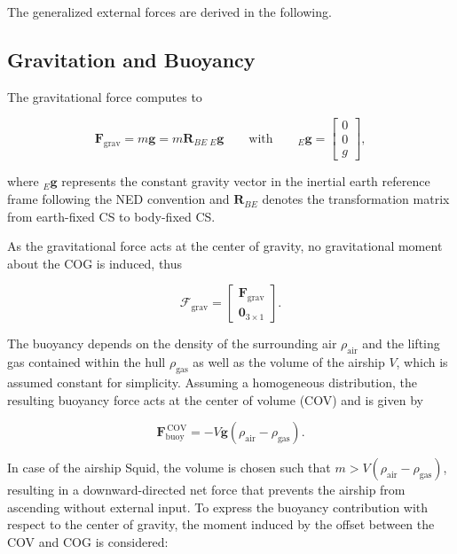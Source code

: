 The generalized external forces are derived in the following.





\subsection{Gravitation and Buoyancy}
The gravitational force computes to

\begin{equation}
	\bm{F}_\mathrm{grav} 
	= 
	m \bm{g} 
	= 
	m \bm{R}_{BE} \, {}_E\bm{g}
	\qquad
	\text{with}
	\qquad
	{}_E\bm{g} 
	= 
	\begin{bmatrix}
		0 \\ 0 \\ g
	\end{bmatrix},
\end{equation}

where ${}_E\bm{g}$ represents the constant gravity vector in the inertial earth reference frame following the NED convention and $\bm{R}_{BE}$ denotes the transformation matrix from earth-fixed CS to body-fixed CS.

As the gravitational force acts at the center of gravity, no gravitational moment about the COG is induced, thus

\begin{equation}
	\bm{\mathcal{F}}_\mathrm{grav} 
	= 
	\begin{bmatrix}
		\bm{F}_\mathrm{grav} \\ \bm{0}_{3 \times 1}
	\end{bmatrix}.
\end{equation}

The buoyancy depends on the density of the surrounding air $\rho_{\mathrm{air}}$ and the lifting gas contained within the hull $\rho_{\mathrm{gas}}$ as well as the volume of the airship $V$, which is assumed constant for simplicity. Assuming a homogeneous distribution, the resulting buoyancy force acts at the center of volume (COV) and is given by

\begin{equation}
	\bm{F}_\mathrm{buoy}^\mathrm{\, COV} = -V \bm{g} (\rho_{\mathrm{air}} - \rho_{\mathrm{gas}}).
\end{equation}

In case of the airship Squid, the volume is chosen such that $m > V(\rho_{\mathrm{air}} - \rho_{\mathrm{gas}})$, resulting in a downward-directed net force that prevents the airship from ascending without external input.
To express the buoyancy contribution with respect to the center of gravity, the moment induced by the offset between the COV and COG is considered:

